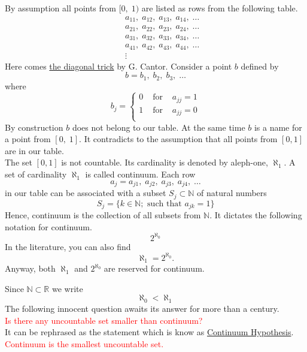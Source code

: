 \documentclass[color=black,11pt]{elegantpaper}
\begin{document}
By assumption all points from $[0,\;1)$ are listed as rows from the following table.
\begin{eqnarray*}
&& a_{11},\;a_{12},\;a_{13},\;a_{14}, \; \dots\\
&& a_{21},\;a_{22},\;a_{23},\;a_{24}, \; \dots\\
&& a_{31},\;a_{32},\;a_{33},\;a_{34}, \; \dots\\
&& a_{41},\;a_{42},\;a_{43},\;a_{44}, \; \dots\\
&& \vdots
\end{eqnarray*}
Here comes \href{https://en.wikipedia.org/wiki/Cantor%27s_diagonal_argument}{the diagonal trick} by G. Cantor. Consider a point $b$ defined by 
$$
b=b_1,\;b_2,\; b_3,\; \dots
$$  
where 
$$
b_j=\left\{\begin{array}{ccc}
           0& \mbox{ for } & a_{jj} =1\\
           1& \mbox{ for } & a_{jj} =0\\
          \end{array} 
    \right. 
$$
By construction $b$ does not belong to our table. At the same time $b$ is a name for a point from $[0,\;1].$ It contradicts to the assumption that all points from $[0,1]$ are in our table.\\
 The set $[0,1]$ is not countable. Its cardinality is denoted by aleph-one, $\aleph_1.$  A set of cardinality $\aleph_1$ is called continuum. Each row
$$
a_j = a_{j1},\;a_{j2},\;a_{j3},\;a_{j4}, \; \dots
$$
in our table can be associated with a subset $S_j \subset \mathbb{N}$ of natural numbers
$$
S_j = \{ k \in \mathbb{N}; \mbox{ such that } a_{jk}=1\} 
$$
Hence, continuum is the collection of all subsets from $\mathbb{N}.$ It dictates the following notation for continuum.
$$
2^{\aleph_0}
$$
In the literature, you can also find 
$$
\aleph_1 = 2^{\aleph_0}.
$$
Anyway, both $\aleph_1$ and $2^{\aleph_0}$ are reserved for continuum.

Since $\mathbb{N} \subset \mathbb{R}$ we write
$$
\aleph_0 < \aleph_1
$$
The following innocent question awaits its answer for more than a century. \\

\textcolor{red}{Is there any uncountable set smaller than continuum?} \\
 
It can be rephrased as the statement which is know as \href{https://en.wikipedia.org/wiki/Continuum_hypothesis}{Continuum Hypothesis}.  \\

\textcolor{red}{Continuum is the smallest uncountable set.}  \\
\end{document}
